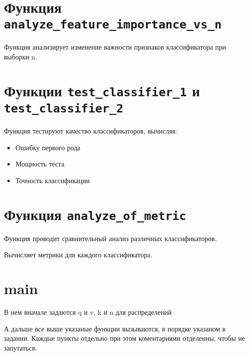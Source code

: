 \documentclass{article}
\begin{document}
\section{Функция \texttt{analyze\_feature\_importance\_vs\_n}}
Функция анализирует изменение важности признаков классификатора при выборки n.

\section{Функции \texttt{test\_classifier\_1} и \texttt{test\_classifier\_2}}
Функция тестируют качество классификаторов, вычисляя:
\begin{itemize}
\item Ошибку первого рода
\item Мощность теста
\item Точность классификации
\end{itemize}

\section{Функция \texttt{analyze\_of\_metric}}
Функция проводит сравнительный анализ различных классификаторов.

Вычисляет метрики для каждого классификатора.

\section{main}

В нем вначале задаются q и v, k и n для распределений

А дальше все выше указаные функции вызываются, в порядке указаном в задании. Каждые пункты отдельно при этом коментариями отделенны, чтобы не запутаться.
\end{document}
